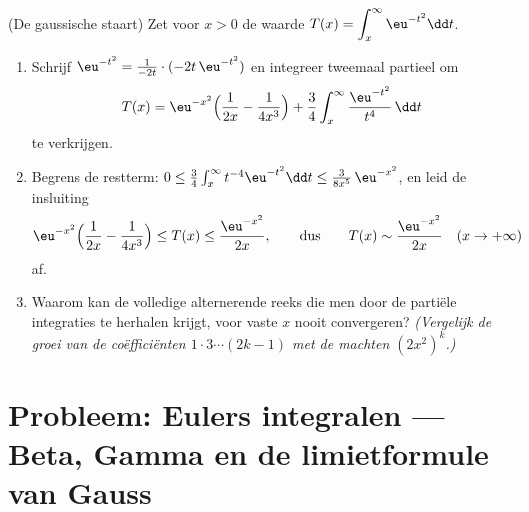 \begin{exercise}[$\star\star\star$]\label{exo:b2:integration:12}
(De gaussische staart) Zet voor $x > 0$ de waarde $T(x) =
\displaystyle \int_x^\infty \eu^{-t^2}\dd t$.
\begin{enumerate}
  \item Schrijf $\eu^{-t^2} = \frac{1}{-2t}\cdot(-2t\,\eu^{-t^2})$
        en integreer tweemaal partieel om
        \[
        T(x) = \eu^{-x^2}\Bigl(\frac{1}{2x} -
        \frac{1}{4x^3}\Bigr) +
        \frac34\int_x^\infty \frac{\eu^{-t^2}}{t^4}\,\dd t
        \]
        te verkrijgen.
  \item Begrens de restterm: $0 \leq \frac34\int_x^\infty
        t^{-4}\eu^{-t^2}\dd t \leq \frac{3}{8x^5}\,\eu^{-x^2}$, en
        leid de insluiting
        \[
        \eu^{-x^2}\Bigl(\frac{1}{2x} - \frac{1}{4x^3}\Bigr)
        \leq T(x) \leq \frac{\eu^{-x^2}}{2x},
        \qquad\text{dus}\qquad
        T(x) \sim \frac{\eu^{-x^2}}{2x} \quad (x \to +\infty)
        \]
        af.
  \item Waarom kan de volledige alternerende reeks die men door de
        partiële integraties te herhalen krijgt, voor vaste $x$
        nooit convergeren? \emph{(Vergelijk de groei van de
        coëfficiënten $1\cdot3\cdots(2k-1)$ met de machten
        $(2x^2)^k$.)}
\end{enumerate}
\end{exercise}

\section{Probleem: Eulers integralen --- Beta, Gamma en de
limietformule van Gauss}

